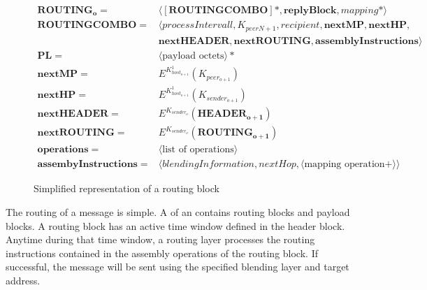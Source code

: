 \begin{figure}[!ht]
	\begin{align}
	\mathbf{ROUTING_o}           = & \langle [ \mathbf{ROUTINGCOMBO} ] *, \mathbf{replyBlock},mapping* \rangle\\  
	\mathbf{ROUTINGCOMBO}        = & \langle processIntervall, K_{peerN+1}, recipient, \mathbf{nextMP}, \mathbf{nextHP}, \nonumber \\
	& \mathbf{nextHEADER}, \mathbf{nextROUTING}, \mathbf{assemblyInstructions} \rangle\\
	\mathbf{PL}                  = & \langle \text{payload octets} \rangle *\\ 
	\mathbf{nextMP}              = & E^{K^1_{host_{o+1}}} \left( K_{peer_{o+1}} \right)\\
	\mathbf{nextHP}              = & E^{K^1_{host_{o+1}}} \left( K_{sender_{o+1}} \right)\\
	\mathbf{nextHEADER}          = & E^{K_{sender_o}} \left( \mathbf{HEADER_{o+1}} \right)\\
	\mathbf{nextROUTING}         = & E^{K_{sender_o}} \left( \mathbf{ROUTING_{o+1}} \right)\\    
	\mathbf{operations}          = & \langle \text{list of operations} \rangle \\
	\mathbf{assembyInstructions} = & \langle  blendingInformation, nextHop, \langle \text{mapping operation} +\rangle \rangle
	\end{align}
	\caption{Simplified representation of a routing block}
	\label{fig:mathRoutingSimplified}
\end{figure}

The routing of a message is simple. A  of an  contains routing blocks and payload blocks. A routing block has an active time window defined in the header block. Anytime during that time window, a routing layer processes the routing instructions contained in the assembly operations of the routing block. If successful, the message will be sent using the specified blending layer and target address.


